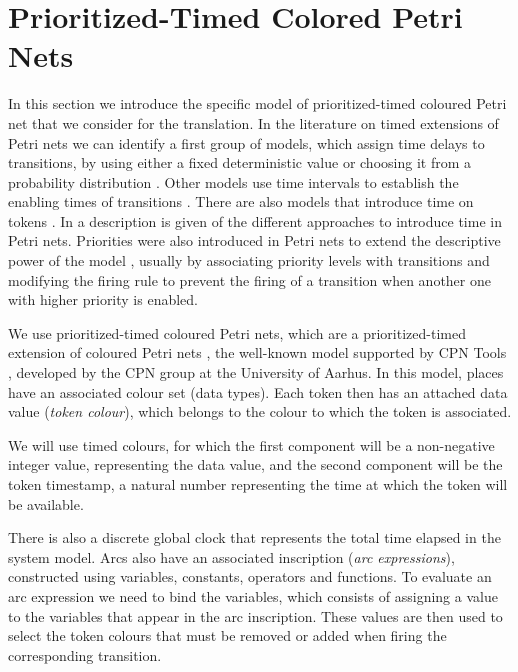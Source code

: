 \section{Prioritized-Timed Colored Petri Nets}\label{petrinet}

In this section we introduce the specific model of prioritized-timed
coloured Petri net that we consider for the translation. 
In the
literature on timed extensions of Petri nets we can identify a
first group of models, which assign time delays to transitions,
by using either a fixed deterministic value
\cite{Ram73,Sif77,VFC93} or choosing it from a probability
distribution \cite{AjCh85}. Other models use time intervals to
establish the enabling times of transitions \cite{Mer74}. 
There are also models that introduce time on tokens
\cite{van93,van95,BLT90}. In \cite{Bow96,Wan98} 
a description is given of the different approaches 
to introduce time in Petri nets.
%
Priorities were also introduced in Petri nets to extend the descriptive 
power of the model \cite{Bau96,Best92,Pet81}, usually by
associating priority levels with transitions and modifying the firing
rule to prevent the firing of a transition when another one with
higher priority is enabled. 

We use prioritized-timed coloured Petri nets, 
which are
a prioritized-timed extension of coloured Petri nets \cite{Jensen97},
the well-known model supported by CPN Tools \cite{CPNTools},
developed by the CPN group at the University of Aarhus.
In this model, places have an associated colour set (data types). 
Each token then  has  an attached data value
({\em token colour}),
which belongs to the colour to which the token is
associated. 

We will use timed colours, for which the first component
will be a non-negative integer value, representing the data value,
and the second component will be the token timestamp,
a natural number representing the time at which the 
token will be available.

There is also a discrete global clock that represents
the total time elapsed in the system model. Arcs also have 
an associated inscription ({\em arc expressions}),
constructed using variables, constants, operators
and functions. 
To evaluate an arc expression we need to
bind the variables, which consists of assigning
a value to the variables that appear in the
arc inscription. These values are then used to
select the token colours that must be removed or added when
firing the corresponding transition.

